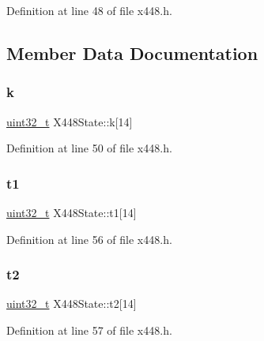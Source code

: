 Definition at line 48 of file x448.\+h.



\subsection{Member Data Documentation}
\mbox{\label{structX448State_a596780b22e97d281d46127df4e9aed1f}} 
\subsubsection{\texorpdfstring{k}{k}}
{\footnotesize\ttfamily \hyperlink{stdint_8h_a435d1572bf3f880d55459d9805097f62}{uint32\+\_\+t} X448\+State\+::k\mbox{[}14\mbox{]}}



Definition at line 50 of file x448.\+h.

\mbox{\label{structX448State_a92dd1b576748a0dc26a0ed15a8ca3cd1}} 
\subsubsection{\texorpdfstring{t1}{t1}}
{\footnotesize\ttfamily \hyperlink{stdint_8h_a435d1572bf3f880d55459d9805097f62}{uint32\+\_\+t} X448\+State\+::t1\mbox{[}14\mbox{]}}



Definition at line 56 of file x448.\+h.

\mbox{\label{structX448State_a07f88e49f9a84b704202974ecfd4c190}} 
\subsubsection{\texorpdfstring{t2}{t2}}
{\footnotesize\ttfamily \hyperlink{stdint_8h_a435d1572bf3f880d55459d9805097f62}{uint32\+\_\+t} X448\+State\+::t2\mbox{[}14\mbox{]}}



Definition at line 57 of file x448.\+h.

\mbox{\label{structX448State_a7e8c8bcd6718ccf02616c415eb1d8a8c}} 
